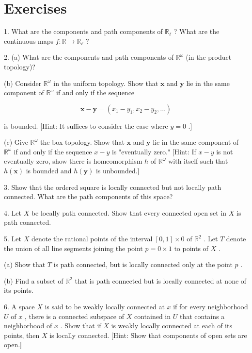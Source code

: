 \documentclass[10pt]{article}
\begin{document}
\section*{Exercises}

1. What are the components and path components of \({\mathbb{R}}_{\ell }\) ? What are the continuous maps \(f : \mathbb{R} \rightarrow  {\mathbb{R}}_{\ell }\) ?

2. (a) What are the components and path components of \({\mathbb{R}}^{\omega }\) (in the product topology)?

(b) Consider \({\mathbb{R}}^{\omega }\) in the uniform topology. Show that \(\mathbf{x}\) and \(\mathbf{y}\) lie in the same component of \({\mathbb{R}}^{\omega }\) if and only if the sequence

\[
\mathbf{x} - \mathbf{y} = \left( {{x}_{1} - {y}_{1},{x}_{2} - {y}_{2},\ldots }\right)
\]

is bounded. [Hint: It suffices to consider the case where \(y = 0\) .]

(c) Give \({\mathbb{R}}^{\omega }\) the box topology. Show that \(\mathbf{x}\) and \(\mathbf{y}\) lie in the same component of \({\mathbb{R}}^{\omega }\) if and only if the sequence \(x - y\) is "eventually zero." [Hint: If \(x - y\) is not eventually zero, show there is homeomorphism \(h\) of \({\mathbb{R}}^{\omega }\) with itself such that \(h\left( \mathbf{x}\right)\) is bounded and \(h\left( \mathbf{y}\right)\) is unbounded.]

3. Show that the ordered square is locally connected but not locally path connected. What are the path components of this space?

4. Let \(X\) be locally path connected. Show that every connected open set in \(X\) is path connected.

5. Let \(X\) denote the rational points of the interval \(\left\lbrack  {0,1}\right\rbrack   \times  0\) of \({\mathbb{R}}^{2}\) . Let \(T\) denote the union of all line segments joining the point \(p = 0 \times  1\) to points of \(X\) .

(a) Show that \(T\) is path connected, but is locally connected only at the point \(p\) .

(b) Find a subset of \({\mathbb{R}}^{2}\) that is path connected but is locally connected at none of its points.

6. A space \(X\) is said to be weakly locally connected at \(x\) if for every neighborhood \(U\) of \(x\) , there is a connected subspace of \(X\) contained in \(U\) that contains a neighborhood of \(x\) . Show that if \(X\) is weakly locally connected at each of its points, then \(X\) is locally connected. [Hint: Show that components of open sets are open.]
\end{document}
